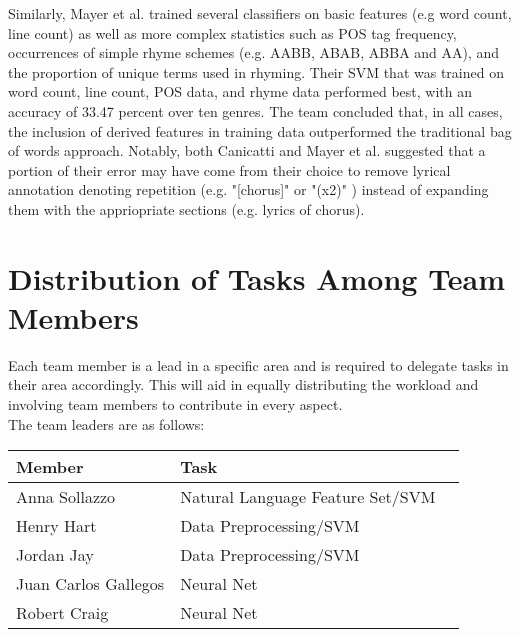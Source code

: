\documentclass[journal]{IEEEtran}
\begin{document}
Similarly, Mayer et al. \cite{mayer} trained several classifiers on basic features (e.g word count, line count) as well as more complex statistics such as POS tag frequency, occurrences of simple rhyme schemes (e.g. AABB, ABAB, ABBA and AA), and the proportion of unique terms used in rhyming. Their SVM that was trained on word count, line count, POS data, and rhyme data performed best, with an accuracy of 33.47 percent over ten genres. The team concluded that, in all cases, the inclusion of derived features in training data outperformed the traditional bag of words approach. Notably, both Canicatti and Mayer et al. suggested that a portion of their error may have come from their choice to remove lyrical annotation denoting repetition (e.g. "[chorus]" or "(x2)" ) instead of expanding them with the appriopriate sections (e.g. lyrics of chorus).\par


\section{Distribution of Tasks Among Team Members}

Each team member is a lead in a specific area and is required to delegate tasks in their area accordingly. This will aid in equally distributing the workload and involving team members to contribute in every aspect.\\ 

The team leaders are as follows:

\begin{table}[h!]
    \label{tab:table1}
    \begin{tabular}{l|l|l|}
      \textbf{Member} & \textbf{Task}\\

      \hline
	Anna Sollazzo & Natural Language Feature Set/SVM\\
	Henry Hart & Data Preprocessing/SVM\\
	Jordan Jay & Data Preprocessing/SVM\\
	Juan Carlos Gallegos & Neural Net\\
	Robert Craig & Neural Net\\

    \end{tabular}
\end{table}

\newpage
\end{document}
